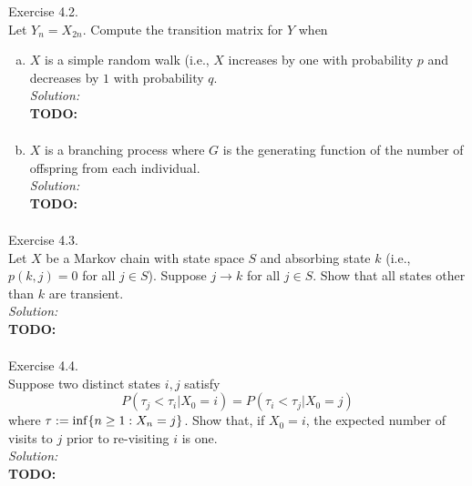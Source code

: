\documentclass[10pt]{amsart}
\begin{document}
 Exercise 4.2. \\
Let $Y_n = X_{2n}$. Compute the transition matrix for $Y$ when

\begin{enumerate}[(a)]
\item $X$ is a simple random walk (i.e., $X$ increases by one with probability $p$ and decreases by $1$ with probability $q$. \\

\noindent
\textit{Solution:} \\
\textbf{TODO:} \\
\begin{align*}
\end{align*}
\item $X$ is a branching process where $G$ is the generating function of the number of offspring from each individual. \\

\noindent
\textit{Solution:} \\
\textbf{TODO:} \\
\begin{align*}
\end{align*}

\end{enumerate}

\newpage


 Exercise 4.3. \\
Let $X$ be a Markov chain with state space $S$ and absorbing state $k$ (i.e., $p(k, j) = 0$ for all $j \in S$).
Suppose $j \rightarrow k$ for all $j \in S$.
Show that all states other than $k$ are transient. \\

\noindent
\textit{Solution:} \\
\textbf{TODO:} \\
\begin{align*}
\end{align*}

\newpage


  Exercise 4.4. \\
Suppose two distinct states $i, j$ satisfy
$$
P(\tau_j < \tau_i | X_0 = i) = P(\tau_i < \tau_j | X_0 = j)
$$
where $\tau := {\rm inf}\{n \geq 1: X_n = j\}$.
Show that, if $X_0 = i$, the expected number of visits to $j$ prior to re-visiting $i$ is one. \\

\noindent
\textit{Solution:} \\
\textbf{TODO:} \\
\begin{align*}
\end{align*}
\end{document}
